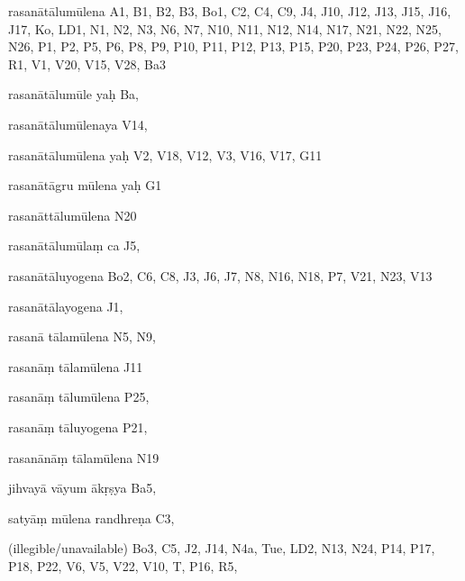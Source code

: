 \begin{ekdosis}
\begin{marma}[hp01_055]
\begin{marma}[hp02_009]
\begin{marma}[hp02_011]
 \begin{marma}[hp02_57a]
\item[rasanātālumūlena] A1, B1, B2, B3, Bo1, C2, C4, C9, J4, J10, J12, J13, J15, J16, J17, Ko, LD1, N1, N2, N3, N6, N7, N10, N11, N12, N14, N17, N21, N22, N25, N26, P1, P2, P5, P6, P8, P9, P10, P11, P12, P13, P15, P20, P23, P24, P26, P27, R1, V1, V20, V15, V28, Ba3
\item[rasanātālumūle yaḥ] Ba,
\item[rasanātālumūlenaya] V14,
\item[rasanātālumūlena yaḥ] V2, V18, V12, V3, V16, V17, G11
\item[rasanātāgru mūlena yaḥ] G1
\item[rasanāttālumūlena] N20
\item[rasanātālumūlaṃ ca] J5, 
\item[rasanātāluyogena] Bo2, C6, C8, J3, J6, J7, N8, N16, N18, P7, V21, N23, V13
\item[rasanātālayogena] J1,
\item[rasanā tālamūlena] N5, N9, 
\item[rasanāṃ tālamūlena] J11
\item[rasanāṃ tālumūlena] P25,
\item[rasanāṃ tāluyogena] P21, 
\item[rasanānāṃ tālamūlena] N19
\item[jihvayā vāyum ākṛṣya] Ba5,
\item[satyāṃ mūlena randhreṇa] C3,
\item[]
\item[(illegible/unavailable)] Bo3, C5, J2, J14, N4a, Tue, LD2, N13, N24, P14, P17, P18, P22, V6, V5, V22, V10, T, P16, R5,
  \begin{description}

    \end{description}
 \end{marma}


\end{marma}
\end{marma}
\end{marma}
\end{ekdosis}

